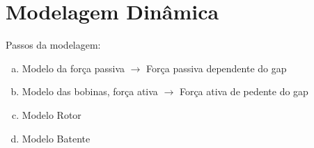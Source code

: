 \pagestyle{empty}
\cleardoublepage
\pagestyle{fancy}

\chapter{Modelagem Dinâmica}

Passos da modelagem:

\begin{enumerate}[a.]
	\item Modelo da força passiva $\rightarrow$ Força passiva dependente do gap
	\item Modelo das bobinas, força ativa  $\rightarrow$ Força ativa de pedente do gap
	\item Modelo Rotor
	\item Modelo Batente
\end{enumerate}


